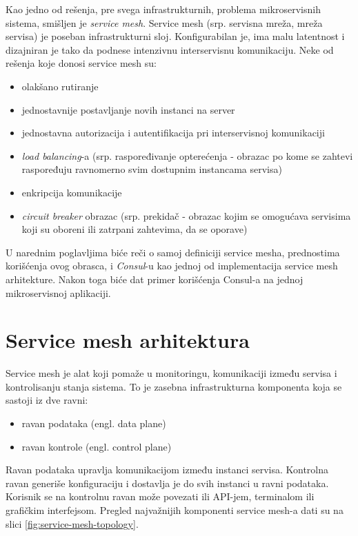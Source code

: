 \documentclass[a4paper,12pt]{report}
\begin{document}
Kao jedno od rešenja, pre svega infrastrukturnih, problema mikroservisnih sistema, smišljen je \textit{service mesh}. Service mesh (srp. servisna mreža, mreža servisa) je poseban infrastrukturni sloj. Konfigurabilan je, ima malu latentnost i dizajniran je tako da podnese intenzivnu interservisnu komunikaciju. Neke od rešenja koje donosi service mesh su: 

\begin{itemize}
	\item olakšano rutiranje
	\item jednostavnije postavljanje novih instanci na server
	\item jednostavna autorizacija i autentifikacija pri interservisnoj komunikaciji
	\item \textit{load balancing}-a (srp. raspoređivanje opterećenja - obrazac po kome se zahtevi raspoređuju ravnomerno svim dostupnim instancama servisa)
	\item enkripcija komunikacije
	\item \textit{circuit breaker} obrazac (srp. prekidač - obrazac kojim se omogućava servisima koji su oboreni ili zatrpani zahtevima, da se oporave)
\end{itemize}

U narednim poglavljima biće reči o samoj definiciji service mesha, prednostima korišćenja ovog obrasca, i \textit{Consul}-u kao jednoj od implementacija service mesh arhitekture. Nakon toga biće dat primer korišćenja Consul-a na jednoj mikroservisnoj aplikaciji.

\chapter{Service mesh arhitektura}

Service mesh je alat koji pomaže u monitoringu, komunikaciji između servisa i kontrolisanju stanja sistema. To je zasebna infrastrukturna komponenta koja se sastoji iz dve ravni: 
\begin{itemize}
	\item ravan podataka (engl. data plane)
	\item ravan kontrole (engl. control plane)
\end{itemize}

Ravan podataka upravlja komunikacijom između instanci servisa. Kontrolna ravan generiše konfiguraciju i dostavlja je do svih instanci u ravni podataka. Korisnik se na kontrolnu ravan može povezati ili API-jem, terminalom ili grafičkim interfejsom. Pregled najvažnijih komponenti service mesh-a dati su na slici  \ref{fig:service-mesh-topology}. 
\end{document}
